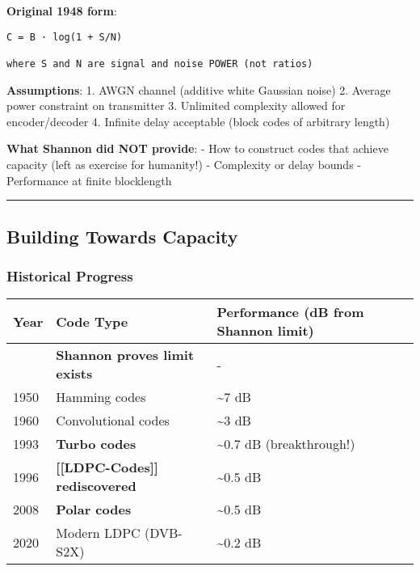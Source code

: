 \textbf{Original 1948 form}:

\begin{verbatim}
C = B · log(1 + S/N)

where S and N are signal and noise POWER (not ratios)
\end{verbatim}

\textbf{Assumptions}: 1. AWGN channel (additive white Gaussian noise) 2.
Average power constraint on transmitter 3. Unlimited complexity allowed
for encoder/decoder 4. Infinite delay acceptable (block codes of
arbitrary length)

\textbf{What Shannon did NOT provide}: - How to construct codes that
achieve capacity (left as exercise for humanity!) - Complexity or delay
bounds - Performance at finite blocklength

\begin{center}\rule{0.5\linewidth}{0.5pt}\end{center}

\subsection{\texorpdfstring{ Building Towards
Capacity}{ Building Towards Capacity}}\label{building-towards-capacity}

\subsubsection{Historical Progress}\label{historical-progress}

{\def\LTcaptype{} %
\begin{longtable}[]{@{}lll@{}}
\toprule\noalign{}
Year & Code Type & Performance (dB from Shannon limit) \\
\midrule\noalign{}
\endhead
\bottomrule\noalign{}
\endlastfoot
1948 & \textbf{Shannon proves limit exists} & - \\
1950 & Hamming codes & \textasciitilde7 dB \\
1960 & Convolutional codes & \textasciitilde3 dB \\
1993 & \textbf{Turbo codes} & \textasciitilde0.7 dB (breakthrough!) \\
1996 & \textbf{{[}{[}LDPC-Codes{]}{]} rediscovered} & \textasciitilde0.5
dB \\
2008 & \textbf{Polar codes} & \textasciitilde0.5 dB \\
2020 & Modern LDPC (DVB-S2X) & \textasciitilde0.2 dB \\
\end{longtable}
}

